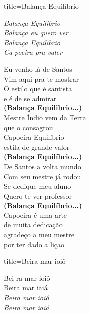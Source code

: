 \documentclass[fontsize=14pt, twoside]{scrreprt}
\begin{document}
\begin{multicols*}{2}
\begin{song}{title={Balança Equilíbrio}}
\begin{verse*}
        \begin{chorus*}
        \textit{Balança Equilibrio}\\
        \textit{Balança eu quero ver}\\
        \textit{Balança Equilibrio}\\
        \textit{Ca} \textit{poeira pra valer}\\
        \end{chorus*}
        
        Eu venho lá de Santos\\
        Vim aqui pra te mostrar\\
        O estilo que é santista\\
        e é de se admirar\\
        \textbf{(Balança Equilibrio...)}\\

        Mestre Índio vem da Terra\\
        que o consagrou\\
        Capoeira Equilíbrio\\
        estila de grande valor\\
        \textbf{(Balança Equilíbrio...)}\\

        De Santos a volta mundo\\
        Com seu mestre já rodou\\
        Se dedique meu aluno\\
        Quero te ver professor\\
        \textbf{(Balança Equilíbrio...)}\\

        Capoeira é uma arte\\
        de muita dedicação\\
        agradeço a meu mestre\\
        por ter dado a liçao\\
    \end{verse*}
\end{song}

\begin{song}{title={Beira mar ioiô}}
    \begin{verse*}
        Bei ra mar ioiô\\
        Beira mar iaiá\\
        \textit{Beira mar ioiô}\\
        \textit{Beira mar iaiá}\\


\end{verse*}
\end{song}
\end{multicols*}
\end{document}
